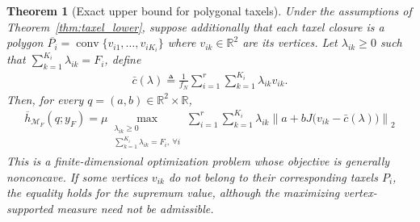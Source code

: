 \documentclass[11pt,a4paper]{article}
\theoremstyle{proposition}
\newtheorem{theorem}{Theorem}[section]
\begin{document}
\begin{theorem}[Exact upper bound for polygonal taxels]
\label{thm:taxel_upper}
    Under the assumptions of Theorem~\ref{thm:taxel_lower},
    suppose additionally that each taxel closure is a polygon $\overline{P_i} = \operatorname{conv}\{v_{i1},\ldots,v_{iK_i}\}$ where $v_{ik}\in\mathbb R^2$ are its vertices. 
    Let $\lambda_{ik} \geq 0$ such that $\sum_{k=1}^{K_i}\lambda_{ik}=F_i$, define
    \begin{align}
        \bar c(\lambda)
        \triangleq
        \frac{1}{f_N}
        \sum_{i=1}^r\sum_{k=1}^{K_i}
        \lambda_{ik}v_{ik}.
    \end{align}
    Then, for every $q=(a,b)\in\mathbb R^2\times\mathbb R$,
    \begin{align}
        \label{eq:taxel_upper_reduction}
        \boxed{\overline h_{\mathcal M_F}(q;y_F)
        =
        \mu
        \max_{\substack{
            \lambda_{ik}\geq0\\
            \sum_{k=1}^{K_i}\lambda_{ik}=F_i,\ \forall i
        }}
        \sum_{i=1}^r\sum_{k=1}^{K_i}
        \lambda_{ik}
        \left\|
        a+bJ\bigl(v_{ik}-\bar c(\lambda)\bigr)
        \right\|_2}
    \end{align}
    This is a finite-dimensional optimization problem whose objective is generally nonconcave.
    If some vertices $v_{ik}$ do not belong to their corresponding taxels $P_i$, the equality holds for the supremum value, although the maximizing vertex-supported measure need not be admissible.
\end{theorem}
\end{document}
